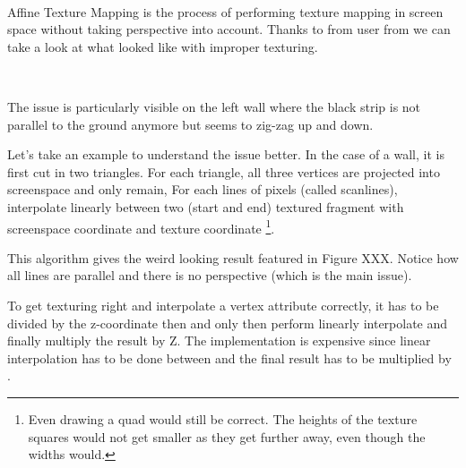 \\
\par
Affine Texture Mapping is the process of performing texture mapping in screen space without taking perspective into account. Thanks to from user  from  we can take a look at what \doom looked like with improper texturing.\\
\par
{}\\
\par
The issue is particularly visible on the left wall where the black strip is not parallel to the ground anymore but seems to zig-zag up and down.\\



\par
Let's take an example to understand the issue better. In the case of a wall, it is first cut in two triangles. For each triangle, all three vertices  are projected into screenspace and only  remain, For each lines of pixels (called scanlines), interpolate linearly between two (start and end) textured fragment with screenspace coordinate  and texture coordinate \footnote{ Even drawing a quad would still be correct. The heights of the texture squares would not get smaller as they get further away, even though the widths would.}.\\
\par
This algorithm gives the weird looking result featured in Figure XXX. Notice how all lines are parallel and there is no perspective (which is the main issue).\\
\par
{}
\par
To get texturing right and interpolate a vertex attribute correctly, it has to be divided by the z-coordinate then and only then perform linearly interpolate and finally multiply the result by Z. The implementation is expensive since linear interpolation has to be done between  and the final result has to be multiplied by . 
\pagebreak




